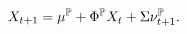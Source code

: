 \begin{equation} \label{eq:nXvarsP}
	X_{t+1} = \mu^{\mathbb{P}} + \Phi^{\mathbb{P}} X_{t}  + \Sigma \nu_{t+1}^{\mathbb{P}} .
\end{equation}
